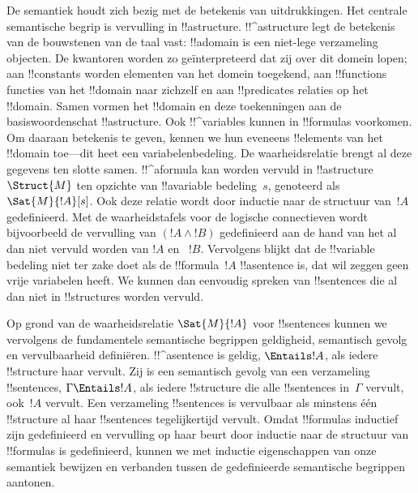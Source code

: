 \documentclass[../../../include/open-logic-section]{subfiles}
\begin{document}


De semantiek houdt zich bezig met de betekenis van uitdrukkingen. Het
centrale semantische begrip is vervulling in !!a{structure}.
!!^a{structure} legt de betekenis van de bouwstenen van de taal vast:
!!a{domain} is een niet-lege verzameling objecten. De kwantoren worden
zo geïnterpreteerd dat zij over dit domein lopen; aan !!{constant}s
worden elementen van het domein toegekend, aan !!{function}s functies
van het !!{domain} naar zichzelf en aan !!{predicate}s relaties op het
!!{domain}. Samen vormen het !!{domain} en deze toekenningen aan de
basiswoordenschat !!a{structure}. Ook !!^{variable}s kunnen in
!!{formula}s voorkomen. Om daaraan betekenis te geven, kennen we hun
eveneens !!{element}s van het !!{domain} toe---dit heet een
variabelenbedeling. De waarheidsrelatie brengt al deze gegevens ten
slotte samen. !!^a{formula} kan worden vervuld in
!!a{structure}~$\Struct{M}$ ten opzichte van !!a{variable} bedeling~$s$,
genoteerd als $\Sat{M}{!A}[s]$. Ook deze relatie wordt door inductie
naar de structuur van~$!A$ gedefinieerd. Met de waarheidstafels voor
de logische connectieven wordt bijvoorbeeld de vervulling van
$(!A \land !B)$ gedefinieerd aan de hand van het al dan niet vervuld
worden van $!A$ en ~$!B$. Vervolgens blijkt dat de !!{variable}
bedeling niet ter zake doet als de !!{formula}~$!A$ !!a{sentence} is,
dat wil zeggen geen vrije variabelen heeft. We kunnen dan eenvoudig
spreken van !!{sentence}s die al dan niet in !!{structure}s worden
vervuld.

Op grond van de waarheidsrelatie $\Sat{M}{!A}$ voor !!{sentence}s
kunnen we vervolgens de fundamentele semantische begrippen geldigheid,
semantisch gevolg en vervulbaarheid definiëren. !!^a{sentence} is
geldig, $\Entails !A$, als iedere !!{structure} haar vervult. Zij is
een semantisch gevolg van een verzameling !!{sentence}s,
$\Gamma \Entails !A$, als iedere !!{structure} die alle !!{sentence}s
in~$\Gamma$ vervult, ook~$!A$ vervult. Een verzameling !!{sentence}s is
vervulbaar als minstens één !!{structure} al haar !!{sentence}s
tegelijkertijd vervult. Omdat !!{formula}s inductief zijn gedefinieerd
en vervulling op haar beurt door inductie naar de structuur van
!!{formula}s is gedefinieerd, kunnen we met inductie eigenschappen van
onze semantiek bewijzen en verbanden tussen de gedefinieerde
semantische begrippen aantonen.
\end{document}
